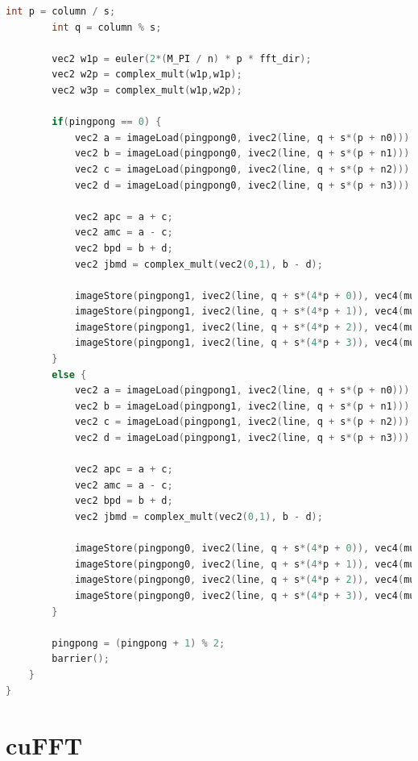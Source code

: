 \documentclass[
  oneside,
  11pt, a4paper,
  footinclude=true,
  headinclude=true,
  cleardoublepage=empty
]{scrbook}
\begin{document}
\begin{lstlisting}[language=C, caption={FFT Radix-4 Stockham Vertical unique pass, see \autoref{subsec:radix4-stockham}}, label={lst:glsl-radix4-stockham-vertical}]
        int p = column / s;
        int q = column % s;

        vec2 w1p = euler(2*(M_PI / n) * p * fft_dir);
        vec2 w2p = complex_mult(w1p,w1p);
        vec2 w3p = complex_mult(w1p,w2p);

        if(pingpong == 0) {
            vec2 a = imageLoad(pingpong0, ivec2(line, q + s*(p + n0))).rg;
            vec2 b = imageLoad(pingpong0, ivec2(line, q + s*(p + n1))).rg;
            vec2 c = imageLoad(pingpong0, ivec2(line, q + s*(p + n2))).rg;
            vec2 d = imageLoad(pingpong0, ivec2(line, q + s*(p + n3))).rg;

            vec2 apc = a + c;
            vec2 amc = a - c;
            vec2 bpd = b + d;
            vec2 jbmd = complex_mult(vec2(0,1), b - d);

            imageStore(pingpong1, ivec2(line, q + s*(4*p + 0)), vec4(mult_factor * (apc + bpd), 0,0));
            imageStore(pingpong1, ivec2(line, q + s*(4*p + 1)), vec4(mult_factor * (complex_mult(w1p, amc + jbmd*fft_dir)), 0,0));
            imageStore(pingpong1, ivec2(line, q + s*(4*p + 2)), vec4(mult_factor * (complex_mult(w2p, apc - bpd )), 0,0));
            imageStore(pingpong1, ivec2(line, q + s*(4*p + 3)), vec4(mult_factor * (complex_mult(w3p, amc - jbmd*fft_dir)), 0,0));
        }
        else {
            vec2 a = imageLoad(pingpong1, ivec2(line, q + s*(p + n0))).rg;
            vec2 b = imageLoad(pingpong1, ivec2(line, q + s*(p + n1))).rg;
            vec2 c = imageLoad(pingpong1, ivec2(line, q + s*(p + n2))).rg;
            vec2 d = imageLoad(pingpong1, ivec2(line, q + s*(p + n3))).rg;

            vec2 apc = a + c;
            vec2 amc = a - c;
            vec2 bpd = b + d;
            vec2 jbmd = complex_mult(vec2(0,1), b - d);

            imageStore(pingpong0, ivec2(line, q + s*(4*p + 0)), vec4(mult_factor * (apc + bpd), 0,0));
            imageStore(pingpong0, ivec2(line, q + s*(4*p + 1)), vec4(mult_factor * (complex_mult(w1p, amc + jbmd*fft_dir)), 0,0));
            imageStore(pingpong0, ivec2(line, q + s*(4*p + 2)), vec4(mult_factor * (complex_mult(w2p, apc - bpd )), 0,0));
            imageStore(pingpong0, ivec2(line, q + s*(4*p + 3)), vec4(mult_factor * (complex_mult(w3p, amc - jbmd*fft_dir)), 0,0));
        }

        pingpong = (pingpong + 1) % 2;
        barrier();
    }
}
\end{lstlisting}

\chapter{cuFFT} \label{apdx:cufft}
\end{document}

